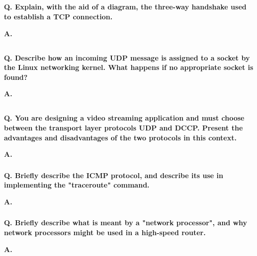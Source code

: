 \subsection{}

\textbf{Q. Explain, with the aid of a diagram, the three-way handshake used to establish
a TCP connection.}

\textbf{A.}

\subsection{}

\textbf{Q. Describe how an incoming UDP message is assigned to a socket by the Linux
networking kernel. What happens if no appropriate socket is found?}

\textbf{A.}

\subsection{}

\subsubsection{}

\textbf{Q. You are designing a video streaming application and must choose between the
transport layer protocols UDP and DCCP. Present the advantages and disadvantages
of the two protocols in this context.}

\textbf{A.}

\subsubsection{}

\textbf{Q. Briefly describe the ICMP protocol, and describe its use in implementing the
"traceroute" command.}

\textbf{A.}

\subsubsection{}

\textbf{Q. Briefly describe what is meant by a "network processor", and why network
processors might be used in a high-speed router.}

\textbf{A.}


